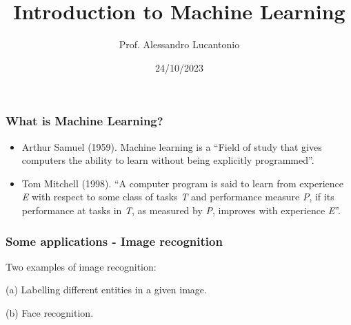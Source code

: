 \documentclass{beamer}
\title{Introduction to Machine Learning}
\author{Prof. Alessandro Lucantonio}
\institute{Aarhus University}
\date{24/10/2023}
\begin{document}
	
	\frame{\titlepage}
	
	\begin{frame}
		\frametitle{What is Machine Learning?}
		\begin{itemize}
			\item Arthur Samuel (1959). Machine learning is a ``Field of study that gives computers the ability to learn without being explicitly programmed”.
			\item Tom Mitchell (1998). ``A computer program is said to learn from experience \textit{E} with respect to some class of tasks \textit{T} and performance measure \textit{P}, if its performance at tasks in \textit{T}, as measured by \textit{P}, improves with experience \textit{E}”.
		\end{itemize}
		
	\end{frame}

	\begin{frame}		
		\frametitle{Some applications - Image recognition}
		\begin{figure}
			\centering
			\qquad
		\end{figure}
	Two examples of image recognition:
	
	(a) Labelling different entities in a given image.
	
	(b) Face recognition.
	\end{frame}
\end{document}
